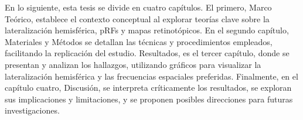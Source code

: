En lo siguiente, esta tesis se divide en cuatro capítulos. El primero, Marco Teórico, establece el contexto conceptual al explorar teorías clave sobre la lateralización hemisférica, pRFs y mapas retinot\'opicos. En el segundo cap\'itulo, Materiales y Métodos se detallan las técnicas y procedimientos empleados, facilitando la replicación del estudio. Resultados, es el tercer cap\'itulo, donde se presentan y analizan los hallazgos, utilizando gráficos para visualizar la lateralización hemisférica y las frecuencias espaciales preferidas. Finalmente, en el capítulo cuatro, Discusión, se interpreta críticamente los resultados, se exploran sus implicaciones y limitaciones, y se proponen posibles direcciones para futuras investigaciones.


 
	




